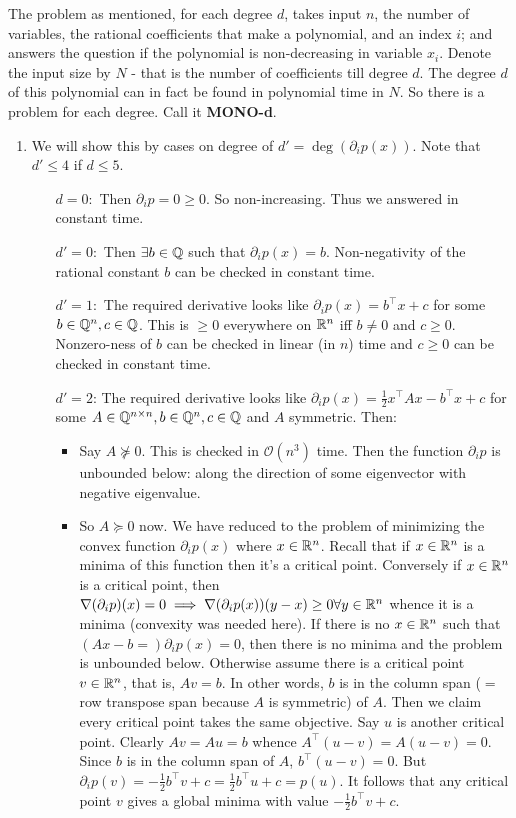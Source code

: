The problem as mentioned, for each degree $d$, takes input $n$, the number of variables, the rational coefficients that make a polynomial, and an index $i$; and answers the question if the polynomial is non-decreasing in variable $x_{i}$. Denote the input size by $N$ - that is the number of coefficients till degree $d$. The degree $d$ of this polynomial can in fact be found in polynomial time in $N$. So there is a problem for each degree. Call it \textbf{MONO-d}.

\begin{enumerate}[label=(\roman*)]
\item We will show this by cases on degree of $d'=\deg(\partial_{i}p(x))$. Note that $d'\le 4$ if $d\le 5$.
\begin{itemize}
\item[$d=0:$] Then $\partial_{i}p = 0\ge 0$. So non-increasing. Thus we answered in constant time.
\item[$d'=0:$] Then $\exists b\in \mathbb{Q}$ such that $\partial_{i}p(x) = b$. Non-negativity of the rational constant $b$ can be checked in constant time.
\item[$d'=1:$] The required derivative looks like $\partial_{i}p(x) = b^{\top}x + c$ for some $b\in\mathbb{Q}^{n}, c\in\mathbb{Q}$. This is $\ge 0$ everywhere on $\mathbb{R}^{n}$ iff $b\ne 0$ and $c\ge 0$. Nonzero-ness of $b$ can be checked in linear (in $n$) time and $c\ge 0$ can be checked in constant time.
\item[$d'=2$:] The required derivative looks like $\partial_{i}p(x) = \frac12x^{\top}Ax - b^{\top}x + c$ for some $A\in\mathbb{Q}^{n\times n},b\in\mathbb{Q}^{n}, c\in\mathbb{Q}$ and $A$ symmetric. Then:
\begin{itemize}
\item Say $A \not\succeq 0$. This is checked in $\mathcal{O}(n^{3})$ time. Then the function $\partial_{i}p$ is unbounded below: along the direction of some eigenvector with negative eigenvalue.
\item So $A\succeq 0$ now. We have reduced to the problem of minimizing the convex function $\partial_{i}p(x)$ where $x\in\mathbb{R}^{n}$. Recall that if $x\in\mathbb{R}^{n}$ is a minima of this function then it's a critical point. Conversely if $x\in \mathbb{R}^{n}$ is a critical point, then $\nabla(\partial_{i}p)(x) = 0\implies \nabla(\partial_{i}p(x))(y-x)\ge0\forall y\in\mathbb{R}^{n}$ whence it is a minima (convexity was needed here). If there is no $x\in\mathbb{R}^{n}$ such that $(Ax-b=)\partial_{i}p(x)=0$, then there is no minima and the problem is unbounded below. Otherwise assume there is a critical point $v \in\mathbb{R}^{n}$, that is, $Av=b$. In other words, $b$ is in the column span ($=$ row transpose span because $A$ is symmetric) of $A$. Then we claim every critical point takes the same objective. Say $u$ is another critical point. Clearly $Av = Au = b$ whence $A^{\top}(u-v)=A(u-v)=0$. Since $b$ is in the column span of $A$, $b^{\top}(u-v)=0$. But $\partial_{i}p(v) = -\frac12b^{\top}v+c = \frac12b^{\top}u+c=p(u)$. It follows that any critical point $v$ gives a global minima with value $-\frac12b^{\top}v+c$. 

\end{itemize}
\end{itemize}
\end{enumerate}
